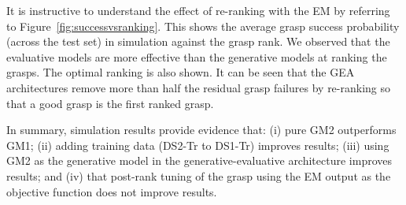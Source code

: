 It is instructive to understand the effect of re-ranking with the EM by referring to Figure~\ref{fig:successvsranking}. This shows the average grasp success probability (across the test set) in simulation against the grasp rank. We observed that the evaluative models are more effective than the generative models at ranking the grasps. The optimal ranking is also shown. It can be seen that the GEA architectures remove more than half the residual grasp failures by re-ranking so that a good grasp is the first ranked grasp.

In summary, simulation results provide evidence that: (i) pure GM2 outperforms GM1; (ii) adding training data (DS2-Tr to DS1-Tr) improves results; (iii) using GM2 as the generative model in the generative-evaluative architecture improves results; and (iv) that post-rank tuning of the grasp using the EM output as the objective function does not improve results.


